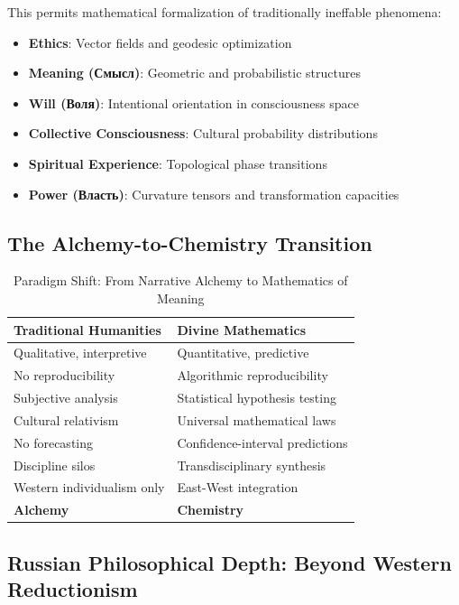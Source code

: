 \documentclass[11pt,a4paper]{article}
\theoremstyle{definition}
\theoremstyle{remark}
\begin{document}
This permits mathematical formalization of traditionally ineffable phenomena:
\begin{itemize}[leftmargin=*]
\item \textbf{Ethics}: Vector fields and geodesic optimization
\item \textbf{Meaning (Смысл)}: Geometric and probabilistic structures
\item \textbf{Will (Воля)}: Intentional orientation in consciousness space
\item \textbf{Collective Consciousness}: Cultural probability distributions
\item \textbf{Spiritual Experience}: Topological phase transitions
\item \textbf{Power (Власть)}: Curvature tensors and transformation capacities
\end{itemize}

\subsection{The Alchemy-to-Chemistry Transition}

\begin{table}[h!]
\centering
\begin{tabular}{|p{5cm}|p{5.5cm}|}
\hline
\textbf{Traditional Humanities} & \textbf{Divine Mathematics} \\
\hline
Qualitative, interpretive & Quantitative, predictive \\
\hline
No reproducibility & Algorithmic reproducibility \\
\hline
Subjective analysis & Statistical hypothesis testing \\
\hline
Cultural relativism & Universal mathematical laws \\
\hline
No forecasting & Confidence-interval predictions \\
\hline
Discipline silos & Transdisciplinary synthesis \\
\hline
Western individualism only & East-West integration \\
\hline
\textbf{Alchemy} & \textbf{Chemistry} \\
\hline
\end{tabular}
\caption{Paradigm Shift: From Narrative Alchemy to Mathematics of Meaning}
\end{table}

\subsection{Russian Philosophical Depth: Beyond Western Reductionism}
\end{document}
